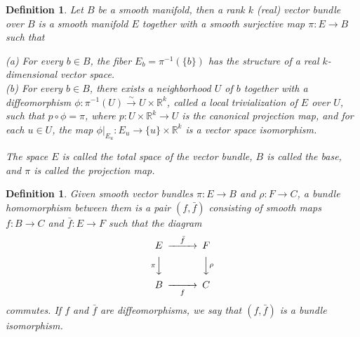 \documentclass{amsart}          %
\newtheorem{definition}[theorem]{Definition}
\newcommand{\R}{\mathbb R}
\begin{document}
\begin{definition}

	Let $B$ be a smooth manifold, then a \textit{rank $k$ (real) vector bundle over $B$} is a smooth manifold $E$ together with a smooth surjective map $\pi:E\to B$ such that\begin{flushleft}
		\textup{(a)} For every $b\in B$, the \textup{fiber} $E_b=\pi^{-1}(\{b\})$ has the structure of a real $k$-dimensional vector space.\\
		\textup{(b)} For every $b\in B$, there exists a neighborhood $U$ of $b$ together with a diffeomorphism $\phi:\pi^{-1}(U)\stackrel{\sim}{\to}U\times\R^k$, called a \textit{local trivialization of $E$ over $U$}, such that $p\circ\phi=\pi$, where $p:U\times\R^k\to U$ is the canonical projection map, and for each $u\in U$, the map $\left.\phi\right|_{E_u}:E_u\to\{u\}\times\R^k$ is a vector space isomorphism.
	\end{flushleft}
The space $E$ is called the \textit{total space} of the vector bundle, $B$ is called the \textit{base}, and $\pi$ is called the \textit{projection map}.
\end{definition}
\begin{definition}
	Given smooth vector bundles $\pi:E\to B$ and $\rho:F\to C$, a bundle homomorphism between them is a pair $(f,\bar{f})$ consisting of smooth maps $f:B\to C$ and $\bar{f}:E\to F$ such that the diagram
	$$
	\begin{CD}
	E @>\bar{f}>> F\\
	@V\pi VV  @VV\rho V\\
	B @>>f> C
	\end{CD}
	$$
	commutes. If $f$ and $\bar{f}$ are diffeomorphisms, we say that $(f,\bar{f})$ is a bundle isomorphism.
\end{definition}
\end{document}
